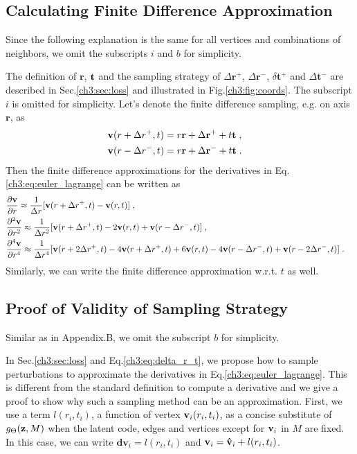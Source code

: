 \subsection{Calculating Finite Difference Approximation}
\label{ch3:sec:appendix_finite_difference}
Since the following explanation is the same for all vertices and combinations of neighbors, we omit the subscripts $i$ and $b$ for simplicity.

The definition of $\mathbf{r}$, $\mathbf{t}$ and the sampling strategy of $\Delta\mathbf{r}^+$, $\Delta\mathbf{r}^-$, $\delta\mathbf{t}^+$ and $\Delta\mathbf{t}^-$ are described in Sec.\ref{ch3:sec:loss} and illustrated in Fig.\ref{ch3:fig:coords}.
The subscript $i$ is omitted for simplicity. 
Let's denote the finite difference sampling, e.g. on axis $\mathbf{r}$, as
\begin{align*}
    & \mathbf{v}(r + \Delta {r^ + },t) = r\mathbf{r} + \Delta \mathbf{r}^ + + t\mathbf{t}\;, \cr
    & \mathbf{v}(r - \Delta {r^ - },t) = r\mathbf{r} + \Delta \mathbf{r}^ - + t\mathbf{t}\;.
\end{align*}
Then the finite difference approximations for the derivatives in Eq.\ref{ch3:eq:euler_lagrange} can be written as
\begin{align*}
  & \frac{{\partial \mathbf{v}}}{{\partial r}} \approx \frac{1}{{\Delta r}}[\mathbf{v}(r + \Delta {r^ + },t) - \mathbf{v}(r,t)]\;,  \cr 
  & \frac{{{\partial ^2}\mathbf{v}}}{{\partial {r^2}}} \approx \frac{1}{{\Delta {r^2}}}[\mathbf{v}(r + \Delta {r^ + },t) - 2\mathbf{v}(r,t) + \mathbf{v}(r - \Delta {r^ - },t)]\;,  \cr 
  & \frac{{{\partial ^4}\mathbf{v}}}{{\partial {r^4}}} \approx \frac{1}{{\Delta {r^4}}}[\mathbf{v}(r + 2\Delta {r^ + },t) - 4\mathbf{v}(r + \Delta {r^ + },t) + 6\mathbf{v}(r,t) - 4\mathbf{v}(r - \Delta {r^ - },t) + \mathbf{v}(r - 2\Delta {r^ - },t)]\;.
\end{align*}
Similarly, we can write the finite difference approximation w.r.t. $t$ as well.

\subsection{Proof of Validity of Sampling Strategy}
\label{ch3:sec:appendix_sampling_proof}
Similar as in Appendix.B, we omit the subscript $b$ for simplicity.

In Sec.\ref{ch3:sec:loss} and Eq.\ref{ch3:eq:delta_r_t}, we propose how to sample perturbations to approximate the derivatives in Eq.\ref{ch3:eq:euler_lagrange}.
This is different from the standard definition to compute a derivative and we give a proof to show why such a sampling method can be an approximation.
First, we use a term $l(r_i, t_i)$, a function of vertex $\mathbf{v}_i(r_i,t_i)$, as a concise substitute of $g_\Theta(\mathbf{z}, M)$ when the latent code, edges and vertices except for $\mathbf{v}_i$ in $M$ are fixed.
In this case, we can write $\mathbf{dv}_i=l(r_i, t_i)$ and $\mathbf{v}_i=\mathbf{\hat{v}}_i+l(r_i, t_i)$.

